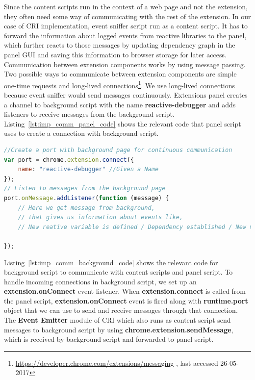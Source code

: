 Since the content scripts run in the context of a web page and not the extension, they often need some way of communicating with the rest of the extension. In our case of CRI implementation, event sniffer script run as a content script. It has to forward the information about logged events from reactive libraries to the panel, which further reacts to those messages by updating dependency graph in the panel GUI and saving this information to browser storage for later access. Communication between extension components works by using message passing.
Two possible ways to communicate between extension components are simple one-time requests and long-lived connections\footnote{\url{https://developer.chrome.com/extensions/messaging} , last accessed 26-05-2017}.
We use long-lived connections because event sniffer would send messages continuously. Extension\textquotesingle s panel creates a channel to background script with the name \textbf{reactive-debugger} and adds listeners to receive messages from the background script.
Listing~\ref{lst:imp_comm_panel_code} shows the relevant code that panel script uses to create a connection with background script.


\begin{lstlisting}[language=JavaScript, caption=Panel Script to Communicate with Background, label={lst:imp_comm_panel_code}]
//Create a port with background page for continuous communication
var port = chrome.extension.connect({
	name: "reactive-debugger" //Given a Name
});
// Listen to messages from the background page
port.onMessage.addListener(function (message) {
	// Here we get message from background,
	// that gives us information about events like,
	// New reative variable is defined / Dependency established / New value of reactive stream
	
});
\end{lstlisting}

Listing~\ref{lst:imp_comm_background_code} shows the relevant code for background script to communicate with content scripts and panel script.
To handle incoming connections in background script, we set up an \textbf{extension.onConnect} event listener. When \textbf{extension.connect} is called from the panel script, \textbf{extension.onConnect} event is fired along with \textbf{runtime.port} object that we can use to send and receive messages through that connection. 
The \textbf{Event Emitter} module of CRI which also runs as content script send messages to background script by using \textbf{chrome.extension.sendMessage}, which is received by background script and forwarded to panel script.

